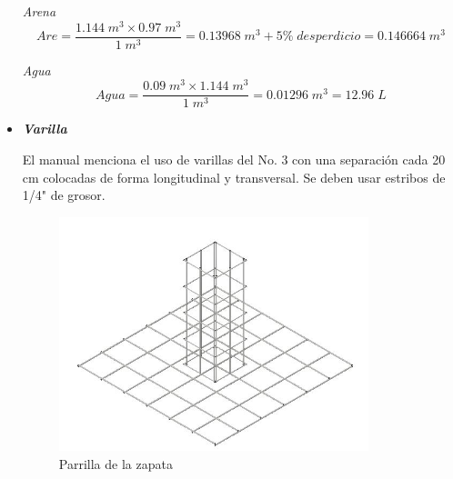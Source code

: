 \begin{itemize}
   \textit{Arena}\\
	\begin{equation}\label{eq:ec1}
		Are = \frac{{1.144 \;m^{3}} \times {0.97\;   m^{3}}}{1\;  m^{3}} = 0. 13968\; m^{3} + 5\%\; desperdicio = 0.146664\;  m^{3} 
	\end{equation}

    \textit{Agua}\\
	\begin{equation}\label{eq:ec1}
		Agua = \frac{{0.09\; m^{3}} \times {1.144\; m^{3}}}{1\;  m^{3}} = 0.01296\; m^{3} = 12.96\; L
	\end{equation}		

\newpage


\item \textbf{\textit{Varilla}}

El manual\cite{CEMEX} menciona el uso de varillas del No. 3 con una separación cada 20 cm colocadas de forma longitudinal y transversal. Se deben usar estribos de 1/4" de grosor. 

\begin{figure}[H]
	\centering
	\includegraphics[width=9cm]{imagenes/zapatita.JPG}
	\caption{Parrilla de la zapata}
	\label{fig:zapatita}
\end{figure}

\end{itemize}
%
